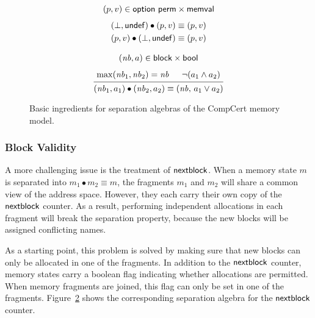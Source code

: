\begin{figure}
  \begin{subfigure}{0.45\textwidth}
    \centering
    \begin{gather*}
      (p, v) \in  \mathsf{option} \  \mathsf{perm}  \times  \mathsf{memval}  \\[1ex]
      (\bot,  \mathsf{undef} ) \bullet (p, v) \equiv (p, v) \\
      (p, v) \bullet (\bot,  \mathsf{undef} ) \equiv (p, v)
    \end{gather*}
    \label{fig:sepdef:contents}
  \end{subfigure}
  \begin{subfigure}{0.45\textwidth}
    \centering
    \begin{gather*}
      (\mathit{nb}, a) \in \kw{block} \times \kw{bool}
      \\[1ex]
      {
        \begin{prooftree}
          \hypo{\mathrm{max}(\mathit{nb}_1, \mathit{nb}_2) = \mathit{nb}}
          \hypo{\lnot (a_1 \wedge a_2)}
          \infer2{(\mathit{nb}_1, a_1) \bullet (\mathit{nb}_2, a_2) \equiv
          (\mathit{nb},\, a_1 \mathbin\vee a_2)}
      \end{prooftree}}
    \end{gather*}
    \label{fig:sepdef:fresh}
  \end{subfigure}
  \caption{%
    Basic ingredients for separation algebras
  of the CompCert memory model.}
  \label{fig:sepdef}
\end{figure}

\subsubsection{Block Validity}

A more challenging issue is the treatment of $ \mathsf{nextblock} $.
When a memory state $m$ is separated into $m_1 \bullet m_2 \equiv m$,
the fragments $m_1$ and $m_2$ will share a common view of the address space.
However,
they each carry their own copy of the $ \mathsf{nextblock} $ counter.
As a result,
performing independent allocations in each fragment
will break the separation property,
because the new blocks will be assigned conflicting names.

As a starting point,
this problem is solved by
making sure that new blocks
can only be allocated in one of the fragments.
In addition to the $ \mathsf{nextblock} $ counter,
memory states carry a boolean flag
indicating whether allocations are permitted.
When memory fragments are joined,
this flag can only be set in one of the fragments.
Figure~\ref{fig:sepdef:fresh}
shows the corresponding separation algebra
for the $ \mathsf{nextblock} $ counter.

